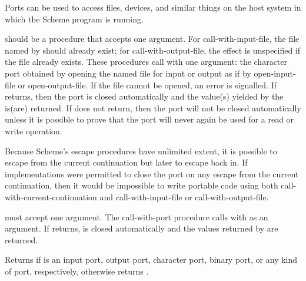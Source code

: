Ports can be used to access files, devices, and similar things on the host
system in which the Scheme program is running.

\begin{entry}{%
}

 should be a procedure that accepts one argument.
For {\cf call-with-input-file},
the file named by  should already exist; for
{\cf call-with-output-file},
the effect is unspecified if the file
already exists. These procedures call  with one argument: the
character port obtained by opening the named file for input or output
as if by {\cf open-input-file} or {\cf open-output-file}.  If the
file cannot be opened, an error is signalled.  If  returns,
then the port is closed automatically and the value(s) yielded by the
 is(are) returned.  If  does not return, then 
the port will not be closed automatically unless it is possible to
prove that the port will never again be used for a read or write
operation.

\begin{rationale}
Because Scheme's escape procedures have unlimited extent, it  is
possible to escape from the current continuation but later to escape back in. 
If implementations were permitted to close the port on any escape from the
current continuation, then it would be impossible to write portable code using
both {\cf call-with-current-continuation} and {\cf call-with-input-file} or
{\cf call-with-output-file}.
\end{rationale} 
\end{entry}

\begin{entry}{%
}

 must accept one argument.  The {\cf call-with-port}
procedure calls  with  as an argument.  If
 returns,  is closed automatically and the values
returned by  are returned.

\end{entry}

\begin{entry}{%
}

Returns \schtrue{} if  is an input port, output port, 
character port, binary port, or any
kind of port, respectively, otherwise returns \schfalse.


\end{entry}


